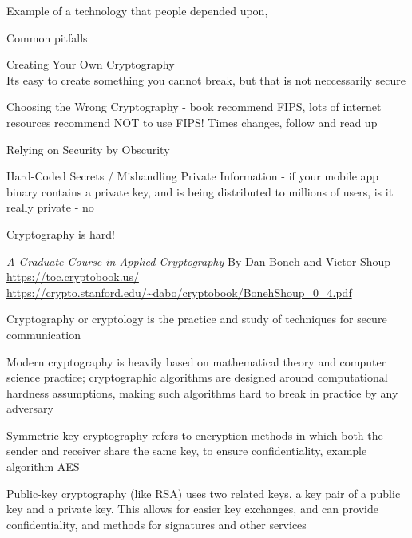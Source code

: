 \documentclass[Screen16to9,17pt]{foils}
\begin{document}
Example of a technology that people depended upon, 



Common pitfalls
\begin{list2}
\item Creating Your Own Cryptography\\
Its easy to create something you cannot break, but that is not neccessarily secure
\item Choosing the Wrong Cryptography - book recommend FIPS, lots of internet resources recommend NOT to use FIPS! Times changes, follow and read up
\item Relying on Security by Obscurity
\item Hard-Coded Secrets / Mishandling Private Information - if your mobile app binary contains a private key, and is being distributed to millions of users, is it really private - no
\end{list2}

Cryptography is hard!
\begin{list1}
\item \emph{A Graduate Course in Applied Cryptography} By Dan Boneh and Victor Shoup\\
 \url{https://toc.cryptobook.us/}\\ \url{https://crypto.stanford.edu/~dabo/cryptobook/BonehShoup_0_4.pdf}
\end{list1}





\begin{list1}
\item Cryptography or cryptology is the practice and study of techniques for secure communication
\item Modern cryptography is heavily based on mathematical theory and computer science practice; cryptographic algorithms are designed around computational hardness assumptions, making such algorithms hard to break in practice by any adversary
\item Symmetric-key cryptography refers to encryption methods in which both the sender and receiver share the same key, to ensure confidentiality, example algorithm AES
\item Public-key cryptography (like RSA) uses two related keys, a key pair of a public key and a private key. This allows for easier key exchanges, and can provide confidentiality, and methods for signatures and other services
\end{list1}
\end{document}
